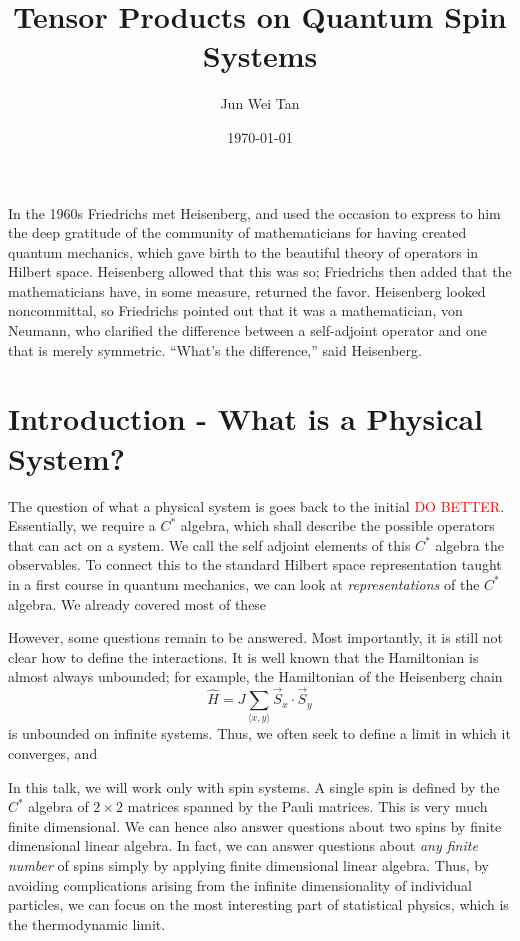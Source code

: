 \documentclass[prb,12pt, nofootinbib]{revtex4-2}
\theoremstyle{definition}
\theoremstyle{definition}
\theoremstyle{definition}
\theoremstyle{definition}
\begin{document}
\title{Tensor Products on Quantum Spin Systems}
	\author{Jun Wei Tan}
	\date{\today}
	\maketitle
	
	\begin{tcolorbox}
		In the 1960s Friedrichs met Heisenberg, and used the occasion to express to him the deep gratitude of the community of mathematicians for having created quantum mechanics, which gave birth to the beautiful theory of operators in Hilbert space. Heisenberg allowed that this was so; Friedrichs then added that the mathematicians have, in some measure, returned the favor. Heisenberg looked noncommittal, so Friedrichs pointed out that it was a mathematician, von Neumann, who clarified the difference between a self-adjoint operator and one that is merely symmetric. ``What's the difference,'' said Heisenberg.
	\end{tcolorbox}
\section{Introduction - What is a Physical System?}
The question of what a physical system is goes back to the initial \textcolor{red}{DO BETTER}. Essentially, we require a $C^*$ algebra, which shall describe the possible operators that can act on a system. We call the self adjoint elements of this $C^*$ algebra the observables. To connect this to the standard Hilbert space representation taught in a first course in quantum mechanics, we can look at \emph{representations} of the $C^*$ algebra. We already covered most of these 

However, some questions remain to be answered. Most importantly, it is still not clear how to define the interactions. It is well known that the Hamiltonian is almost always unbounded; for example, the Hamiltonian of the Heisenberg chain
\[
\hat{H} = J\sum_{\langle x,y\rangle} \vec{S}_x \cdot \vec{S}_y
\] 
is unbounded on infinite systems. Thus, we often seek to define a limit in which it converges, and 

In this talk, we will work only with spin systems. A single spin is defined by the $C^*$ algebra of $2\times 2$ matrices spanned by the Pauli matrices. This is very much finite dimensional. We can hence also answer questions about two spins by finite dimensional linear algebra. In fact, we can answer questions about \emph{any finite number} of spins simply by applying finite dimensional linear algebra. Thus, by avoiding complications arising from the infinite dimensionality of individual particles, we can focus on the most interesting part of statistical physics, which is the thermodynamic limit.
\end{document}
